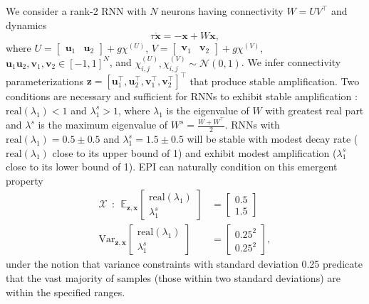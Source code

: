 \documentclass[11pt]{article}
\begin{document}
We consider a rank-2 RNN with $N$ neurons having connectivity $W = UV^\top$
 and dynamics
 \begin{equation}
 \tau \dot{\mathbf{x}} = -\mathbf{x} + W\mathbf{x},
 \end{equation}
where $U = \begin{bmatrix} \mathbf{u}_1 & \mathbf{u}_2 \end{bmatrix} + g \chi^{(U)}$, $V = \begin{bmatrix} \mathbf{v}_1 & \mathbf{v}_2 \end{bmatrix} + g\chi^{(V)}$, $\mathbf{u}_1 \mathbf{u}_2, \mathbf{v}_1, \mathbf{v}_2 \in \left[-1, 1 \right]^N$, and $\chi^{(U)}_{i,j}, \chi^{(V)}_{i,j} \sim \mathcal{N}(0, 1)$.
We infer connectivity parameterizations $\mathbf{z} = \left[\mathbf{u}_1^\top, \mathbf{u}_2^\top, \mathbf{v}_1^\top, \mathbf{v}_2^\top \right]^\top$   that produce stable amplification.
Two conditions are necessary and sufficient for RNNs to exhibit stable amplification \cite{bondanelli2020coding}:  $\text{real}(\lambda_1) < 1$ and
$\lambda^s_1 > 1$, where $\lambda_1$ is the eigenvalue of $W$ with greatest real part and $\lambda^s$ is the maximum eigenvalue of $W^s = \frac{W + W^\top}{2}$.
RNNs  with $\text{real}(\lambda_1) = 0.5 \pm 0.5$ and $\lambda_1^s = 1.5 \pm 0.5$ will be stable with modest decay rate ($\text{real}(\lambda_1)$ close to its upper bound of 1) and exhibit modest amplification ($\lambda_1^s$ close to its lower bound of 1).
 EPI can naturally condition on this emergent property
\begin{equation}\label{eq:EP_LRRNN}
\begin{split}
\mathcal{X} ~~:~~ \mathbb{E}_{\mathbf{z}, \mathbf{x}} \begin{bmatrix} \text{real}(\lambda_1) \\ \lambda^s_1 \end{bmatrix} &= \begin{bmatrix} 0.5 \\ 1.5 \end{bmatrix} \\
\text{Var}_{\mathbf{z}, \mathbf{x}} \begin{bmatrix} \text{real}(\lambda_1) \\ \lambda^s_1 \end{bmatrix} &= \begin{bmatrix} 0.25^2 \\ 0.25^2 \end{bmatrix},
\end{split}
\end{equation}
under the notion that variance constraints with standard deviation 0.25 predicate that the vast majority of samples (those within two standard deviations) are within the specified ranges.
\end{document}
